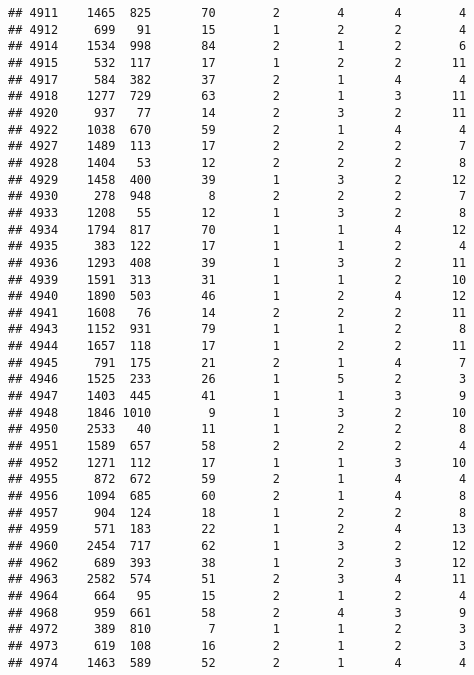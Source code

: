 \documentclass[]{article}
\begin{document}
\begin{verbatim}
## 4911    1465  825       70        2        4       4        4
## 4912     699   91       15        1        2       2        4
## 4914    1534  998       84        2        1       2        6
## 4915     532  117       17        1        2       2       11
## 4917     584  382       37        2        1       4        4
## 4918    1277  729       63        2        1       3       11
## 4920     937   77       14        2        3       2       11
## 4922    1038  670       59        2        1       4        4
## 4927    1489  113       17        2        2       2        7
## 4928    1404   53       12        2        2       2        8
## 4929    1458  400       39        1        3       2       12
## 4930     278  948        8        2        2       2        7
## 4933    1208   55       12        1        3       2        8
## 4934    1794  817       70        1        1       4       12
## 4935     383  122       17        1        1       2        4
## 4936    1293  408       39        1        3       2       11
## 4939    1591  313       31        1        1       2       10
## 4940    1890  503       46        1        2       4       12
## 4941    1608   76       14        2        2       2       11
## 4943    1152  931       79        1        1       2        8
## 4944    1657  118       17        1        2       2       11
## 4945     791  175       21        2        1       4        7
## 4946    1525  233       26        1        5       2        3
## 4947    1403  445       41        1        1       3        9
## 4948    1846 1010        9        1        3       2       10
## 4950    2533   40       11        1        2       2        8
## 4951    1589  657       58        2        2       2        4
## 4952    1271  112       17        1        1       3       10
## 4955     872  672       59        2        1       4        4
## 4956    1094  685       60        2        1       4        8
## 4957     904  124       18        1        2       2        8
## 4959     571  183       22        1        2       4       13
## 4960    2454  717       62        1        3       2       12
## 4962     689  393       38        1        2       3       12
## 4963    2582  574       51        2        3       4       11
## 4964     664   95       15        2        1       2        4
## 4968     959  661       58        2        4       3        9
## 4972     389  810        7        1        1       2        3
## 4973     619  108       16        2        1       2        3
## 4974    1463  589       52        2        1       4        4

\end{verbatim}
\end{document}
